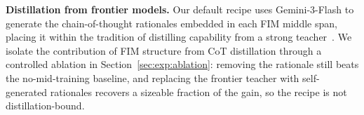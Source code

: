 \textbf{Distillation from frontier models.}
Our default recipe uses Gemini-3-Flash to generate the chain-of-thought
rationales embedded in each FIM middle span, placing it within the
tradition of distilling capability from a strong teacher~\citep{orca,
selfinstruct, distillwhisper}. We isolate the contribution of FIM
structure from CoT distillation through a controlled ablation in
Section~\ref{sec:exp:ablation}: removing the rationale still beats the
no-mid-training baseline, and replacing the frontier teacher with
self-generated rationales recovers a sizeable fraction of the gain, so
the recipe is not distillation-bound.
